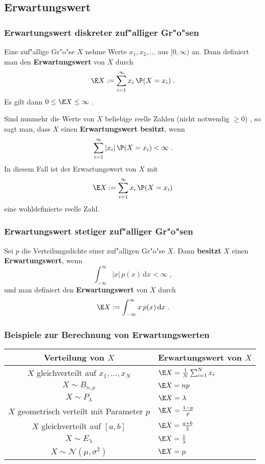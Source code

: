\subsection{Erwartungswert}
\subsubsection{Erwartungswert diskreter zuf"alliger Gr"o"sen}
Eine zuf"allige Gr"o"se $X$ nehme Werte $x_1,x_2,\ldots$ aus $[0,\infty)$ an. Dann
definiert man den \textbf{Erwartungswert} von $X$ durch
$$
\E X :=\sum_{i=1}^\infty x_i\,\P(X=x_i)\;.
$$
Es gilt dann $0\le \E X \le \infty$ .

Sind nunmehr die Werte von $X$ beliebige reelle Zahlen (nicht notwendig $\ge 0$)
, so sagt man, dass $X$ einen \textbf{Erwartungswert
besitzt}, wenn
$$
\sum_{i=1}^\infty |x_i|\,\P(X=x_i)<\infty\;.
$$
In diesem Fall ist der Erwartungswert von $X$ mit
$$
\E X :=\sum_{i=1}^\infty x_i\,\P(X=x_i)
$$
eine wohldefinierte reelle Zahl.

\subsubsection{Erwartungswert stetiger zuf"alliger Gr"o"sen}
Sei $p$ die Verteilungsdichte einer zuf"alligen Gr"o"se $X$. Dann \textbf{besitzt} $X$ einen
\textbf{Erwartungswert}, wenn
$$
\int_{-\infty}^\infty |x|\,p(x)\,\mathrm   d x <\infty\;,
$$
und man definiert den \textbf{Erwartungswert} von $X$ durch
$$
\E X := \int_{-\infty}^\infty x \,p(x)\,\mathrm   d x\;.
$$
\subsubsection{Beispiele zur Berechnung von Erwartungswerten}
\medskip

{\renewcommand{\arraystretch}{1.4}
\begin{center}
\begin{tabular}{|c|l|}\hline
\bf Verteilung von $X$& \bf Erwartungswert von $X$\\ \hline\hline
$X$ gleichverteilt auf $x_1,\ldots,x_N$& $\E X=\frac{1}{N}\sum_{i=1}^N x_i$\\ \hline
$X\sim B_{n,p}$& $\E X= n p$\\ \hline
$X\sim P_\lambda$&$\E X= \lambda$\\ \hline
$X$ geometrisch verteilt mit Parameter $p$& $\E X = \frac{1-p}{p}$\\ \hline
$X$ gleichverteilt auf $[a,b]$& $\E X= \frac{a+b}{2}$\\ \hline
$X\sim E_\lambda$& $\E X = \frac{1}{\lambda}$\\ \hline
$X\sim \mathcal N(\mu,\sigma^2)$&$ \E X = \mu$\\ \hline
\end{tabular}
\end{center}
}
